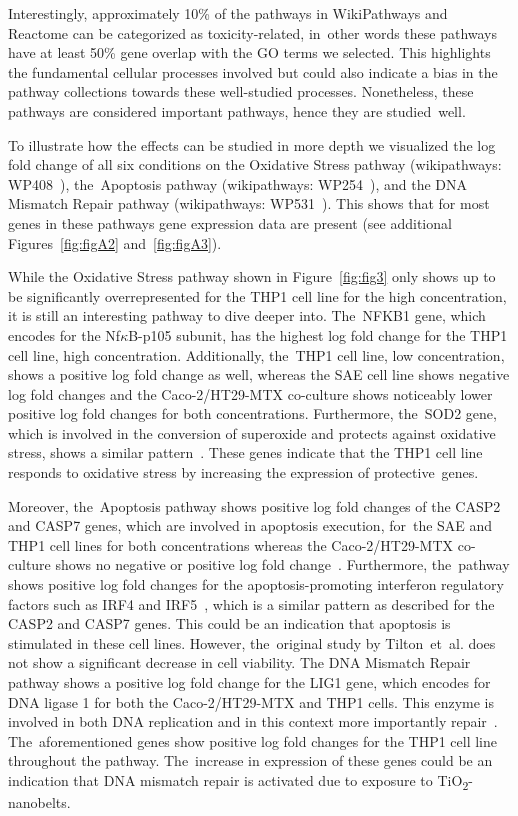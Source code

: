 \documentclass[ijms,article,accept,moreauthors,pdftex]{Definitions/mdpi}
\begin{document}
\begin{paracol}{2}
Interestingly, approximately 10\% of the pathways in WikiPathways and Reactome can be categorized as toxicity-related, in~other words these pathways have at least 50\% gene overlap with the GO terms we selected. This highlights the fundamental cellular processes involved but could also indicate a bias in the pathway collections towards these well-studied processes. Nonetheless, these pathways are considered important pathways, hence they are studied~well.  

To illustrate how the effects can be studied in more depth we visualized the log fold change of all six conditions on the Oxidative Stress pathway (wikipathways: WP408~\cite{WP408}), the~Apoptosis pathway (wikipathways: WP254~\cite{WP254}), and the DNA Mismatch Repair pathway (wikipathways: WP531~\cite{WP531}). This shows that for most genes in these pathways gene expression data are present (see additional Figures~\ref{fig:figA2} and~\ref{fig:figA3}). 

While the Oxidative Stress pathway shown in Figure~\ref{fig:fig3} only shows up to be significantly overrepresented for the THP1 cell line for the high concentration, it is still an interesting pathway to dive deeper into. The~NFKB1 gene, which encodes for the Nf$\kappa$B-p105 subunit, has the highest log fold change for the THP1 cell line, high concentration. Additionally, the~THP1 cell line, low concentration, shows a positive log fold change as well, whereas the SAE cell line shows negative log fold changes and the {Caco-2/HT29-MTX co-culture} shows noticeably lower positive log fold changes for both concentrations. Furthermore, the~SOD2 gene, which is involved in the conversion of superoxide and protects against oxidative stress, shows a similar pattern~\cite{Urso2003}. These genes indicate that the THP1 cell line responds to oxidative stress by increasing the expression of protective~genes. 


Moreover, the~Apoptosis pathway shows positive log fold changes of the CASP2 and CASP7 genes, which are involved in apoptosis execution, for~the SAE and THP1 cell lines for both concentrations whereas the {Caco-2/HT29-MTX co-culture} shows no negative or positive log fold change~\cite{BouchierHayes2011,Lamkanfi2010}. Furthermore, the~pathway shows positive log fold changes for the apoptosis-promoting interferon regulatory factors such as IRF4 and IRF5~\cite{Stang2007,Fanzo2003,Hu2009}, which is a similar pattern as described for the CASP2 and CASP7 genes. This could be an indication that apoptosis is stimulated in these cell lines. However, the~original study by Tilton~et~al. does not show a significant decrease in cell viability. 
The DNA Mismatch Repair pathway shows a positive log fold change {for the LIG1 gene}, which encodes for DNA ligase 1 {for both the Caco-2/HT29-MTX and THP1 cells}. This enzyme is involved in both DNA replication and in this context more importantly repair~\cite{Mota2019}. The~aforementioned genes show positive log fold changes for the THP1 cell line throughout the pathway. The~increase in expression of these genes could be an indication that DNA mismatch repair is activated due to exposure to TiO\textsubscript{2}-nanobelts.


\end{paracol}
\end{document}
